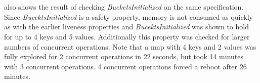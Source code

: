 \documentclass{uit-thesis}
\begin{document}
\\\\
 also shows the result of checking \textit{BucketsInitialized} on the same specification. Since \textit{BucektsInitialized} is a safety property, memory is not consumed as quickly as with the earlier liveness properties and \textit{BucektsInitialized} was shown to hold for up to 4 keys and 5 values. Additionally this property was checked for larger numbers of concurrent operations. Note that a map with 4 keys and 2 values was fully explored for 2 concurrent operations in 22 seconds, but took 14 minutes with 3 concurrent operations. 4 concurrent operations forced a reboot after 26 minutes.
\begin{table}
    \centering
    \caption{Model checking SOConcurrent with operation IDs}
    \label{tab:SOConcurrent_ID}
\end{table}
\end{document}
